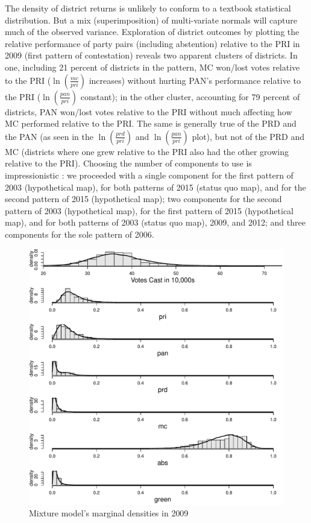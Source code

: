 \documentclass[letter,12pt]{article}
\begin{document}
The density of district returns is unlikely to conform to a textbook statistical distribution. But a mix (superimposition) of multi-variate normals will capture much of the observed variance. Exploration of district outcomes by plotting the relative performance of party pairs (including abstention) relative to the PRI in 2009 (first pattern of contestation) reveals two apparent clusters of districts. In one, including 21 percent of districts in the pattern, MC won/lost votes relative to the PRI ($\ln(\frac{mc}{pri})$ increases) without hurting PAN's performance relative to the PRI ($\ln(\frac{pan}{pri})$ constant); in the other cluster, accounting for 79 percent of districts, PAN won/lost votes relative to the PRI without much affecting how MC performed relative to the PRI. The same is generally true of the PRD and the PAN (as seen in the $\ln(\frac{prd}{pri})$ and $\ln(\frac{pan}{pri})$ plot), but not of the PRD and MC (districts where one grew relative to the PRI also had the other growing relative to the PRI). Choosing the number of components to use is impressionistic \citep[][:405]{linzerSeatVoteElasticity2012}: we proceeded with a single component for the first pattern of 2003 (hypothetical map), for both patterns of 2015 (status quo map), and for the second pattern of 2015 (hypothetical map); two components for the second pattern of 2003 (hypothetical map), for the first pattern of 2015 (hypothetical map), and for both patterns of 2003 (status quo map), 2009, and 2012; and three components for the sole pattern of 2006.

\begin{figure}
\centering 
  \includegraphics[width=.7\columnwidth]{linzerMg2009.pdf} 
  \caption{Mixture model's marginal densities in 2009}\label{F:linzerMg}
\end{figure}
\end{document}
